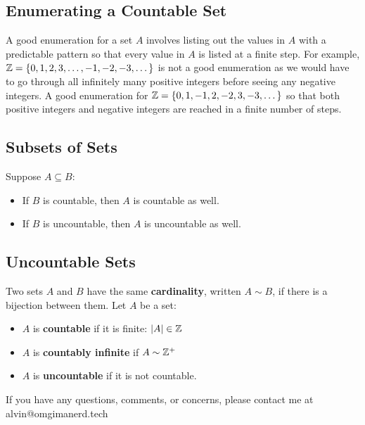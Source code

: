 \documentclass[letterpaper, 12pt]{math}
\begin{document}
\subsection*{Enumerating a Countable Set}
A good enumeration for a set \( A \) involves listing out the values in \( A \)
with a predictable pattern so that every value in \( A \) is listed at a finite
step. For example, \( \mathbb{Z} = \{0,1,2,3,\dots,-1,-2,-3,\dots\} \) is not a good
enumeration as we would have to go through all infinitely many positive
integers before seeing any negative integers. A good enumeration for
\( \mathbb{Z} = \{0,1,-1,2,-2,3,-3,\dots\} \) so that both positive integers and
negative integers are reached in a finite number of steps.

\subsection*{Subsets of Sets}
Suppose \( A\subseteq B \):
\begin{itemize}
  \item If \( B \) is countable, then \( A \) is countable as well.
  \item If \( B \) is uncountable, then \( A \) is uncountable as well.
\end{itemize}

\subsection*{Uncountable Sets}
Two sets \( A \) and \( B \) have the same \textbf{cardinality}, written
\( A\sim B \), if there is a bijection between them.
Let \( A \) be a set:
\begin{itemize}
  \item \( A \) is \textbf{countable} if it is finite: \( |A| \in \mathbb{Z} \)
  \item \( A \) is \textbf{countably infinite} if \( A \sim \mathbb{Z}^{+} \)
  \item \( A \) is \textbf{uncountable} if it is not countable.
\end{itemize}

\begin{center}
  If you have any questions, comments, or concerns, please contact me at
  alvin@omgimanerd.tech
\end{center}
\end{document}

